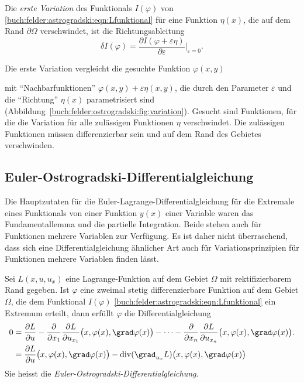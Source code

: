 \begin{definition}[1.~Variation]
Die {\em erste Variation} des Funktionals $I(\varphi)$ von
\eqref{buch:felder:astrogradski:eqn:Lfunktional}
für eine Funktion $\eta(x)$, die auf dem Rand $\partial\Omega$ verschwindet,
ist die Richtungsableitung
\[
\delta I(\varphi)
=
\frac{\partial I(\varphi+\varepsilon \eta)}{\partial \varepsilon}
\bigg|_{\varepsilon=0}.
\]
\end{definition}

Die erste Variation vergleicht die gesuchte Funktion $\varphi(x,y)$

mit ``Nachbarfunktionen'' $\varphi(x,y)+\varepsilon\eta(x,y)$,
die durch den Parameter $\varepsilon$ und die ``Richtung''
$\eta(x)$ parametrisiert sind
(Abbildung~\ref{buch:felder:ostrogradski:fig:variation}).
Gesucht sind Funktionen, für die die Variation für alle zulässigen
Funktionen $\eta$ verschwindet.
Die zulässigen Funktionen müssen differenzierbar sein und auf dem
Rand des Gebietes verschwinden.

%
%
\subsection{Euler-Ostrogradski-Differentialgleichung}
Die Hauptzutaten für die Euler-Lagrange-Differentialgleichung für
die Extremale eines Funktionals von einer Funktion $y(x)$ einer
Variable waren das Fundamentallemma und die partielle Integration.
Beide stehen auch für Funktionen mehrere Variablen zur Verfügung.
Es ist daher nicht überraschend, dass sich eine Differentialgleichung
ähnlicher Art auch für Variationsprinzipien für Funktionen mehrere
Variablen finden lässt.

\begin{satz}
Sei $L(x,u,u_x)$ eine Lagrange-Funktion auf dem Gebiet $\Omega$ mit
rektifizierbarem Rand gegeben.
Ist $\varphi$ eine zweimal stetig differenzierbare Funktion auf
dem Gebiet $\Omega$, die dem Funktional $I(\varphi)$ 
\eqref{buch:felder:astrogradski:eqn:Lfunktional}
ein Extremum erteilt, dann erfüllt $\varphi$ die Differentialgleichung
\begin{equation}
\begin{aligned}
0
&=
\frac{\partial L}{\partial u} 
-
\frac{\partial}{\partial x_1}
\frac{\partial L}{\partial u_{x_1}}\bigl(x,\varphi(x),\grad\varphi(x)\bigr)
-
\dots
-
\frac{\partial}{\partial x_n}
\frac{\partial L}{\partial u_{x_n}}\bigl(x,\varphi(x),\grad\varphi(x)\bigr).
\\
&=
\frac{\partial L}{\partial u}\bigl(x,\varphi(x),\grad\varphi(x)\bigr)
-
\operatorname{div}
(\grad_{u_x} L)\bigl(x,\varphi(x),\grad\varphi(x)\bigr)
\end{aligned}
\label{buch:felder:ostrogradski:eqn:euler-ostrogradski}
\end{equation}
Sie heisst die {\em Euler-Ostrogradski-Differentialgleichung}.
%
\end{satz}


